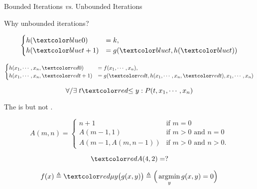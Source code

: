 
\begin{frame}{}
  \centerline{\LARGE Bounded Iterations \emph{vs.} Unbounded Iterations}

  \vspace{0.80cm}

  \vspace{0.40cm}
  \pause
  \centerline{\Large {} Why unbounded iterations?}
\end{frame}

\begin{frame}{}
  \begin{definition}
    \[
      \begin{cases}
	h(\blue{0}) &= k, \\
	h(\blue{t + 1}) &= g(\blue{t}, h(\blue{t}))
      \end{cases}
    \]

    \pause
    \[
      \begin{cases}
	h(x_1, \cdots, x_n, \red{0}) &= f(x_1, \cdots, x_n), \\
	h(x_1, \cdots, x_n, \red{t + 1}) &= g(\red{t}, h(x_1, \cdots, x_n, \red{t}), x_1, \cdots, x_n)
      \end{cases}
    \]
  \end{definition}

  \pause
  \[
    \forall/\exists\; t \red{\le y}: P(t, x_1, \cdots, x_n)
  \]
\end{frame}

\begin{frame}{}

  \begin{theorem}
    The  is  but not .

    \pause
    \[
      A(m, n) =
      \begin{cases}
	n+1 & \mbox{if } m = 0 \\
	A(m-1, 1) & \mbox{if } m > 0 \mbox{ and } n = 0 \\
	A(m-1, A(m, n-1)) & \mbox{if } m > 0 \mbox{ and } n > 0.
      \end{cases}
    \]

    \pause
    \[
      \red{A(4,2) = ?}
    \]
  \end{theorem}

  \pause
  \[
    f(x) \triangleq \red{\mu} y \big(g(x, y)\big) \triangleq \Big(\argmin_{y} g(x,y) = 0\Big)
  \]
\end{frame}
